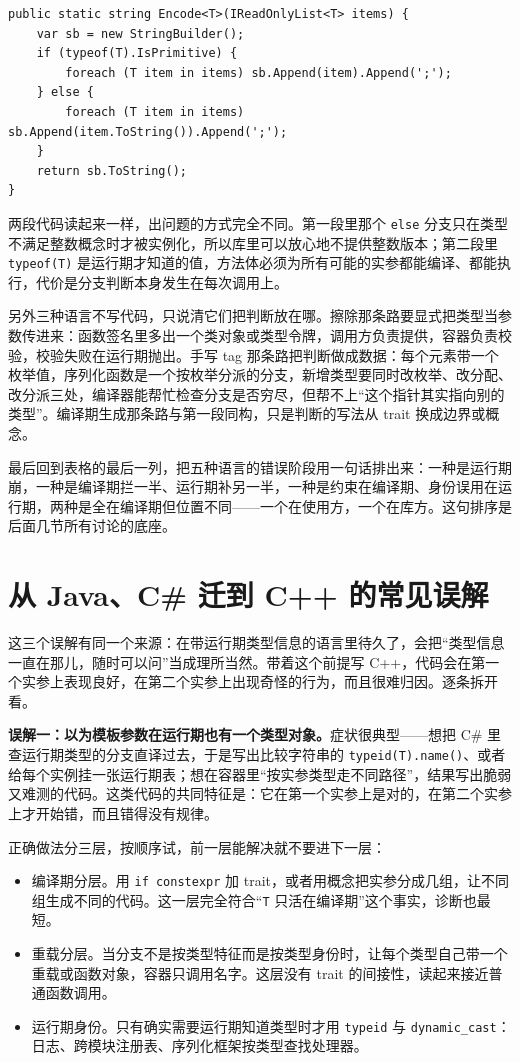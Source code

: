 \documentclass[12pt,a4paper,fontset=fandol]{ctexbook}
\newcommand{\kw}[1]{\texttt{#1}}
\begin{document}
\begin{lstlisting}[style=csharpstyle,caption={C\#：查的是运行期类型对象，同一个方法体对所有实参共享}]
public static string Encode<T>(IReadOnlyList<T> items) {
    var sb = new StringBuilder();
    if (typeof(T).IsPrimitive) {
        foreach (T item in items) sb.Append(item).Append(';');
    } else {
        foreach (T item in items) sb.Append(item.ToString()).Append(';');
    }
    return sb.ToString();
}
\end{lstlisting}

两段代码读起来一样，出问题的方式完全不同。第一段里那个 \kw{else} 分支只在类型不满足整数概念时才被实例化，所以库里可以放心地不提供整数版本；第二段里 \kw{typeof(T)} 是运行期才知道的值，方法体必须为所有可能的实参都能编译、都能执行，代价是分支判断本身发生在每次调用上。

另外三种语言不写代码，只说清它们把判断放在哪。擦除那条路要显式把类型当参数传进来：函数签名里多出一个类对象或类型令牌，调用方负责提供，容器负责校验，校验失败在运行期抛出。手写 tag 那条路把判断做成数据：每个元素带一个枚举值，序列化函数是一个按枚举分派的分支，新增类型要同时改枚举、改分配、改分派三处，编译器能帮忙检查分支是否穷尽，但帮不上“这个指针其实指向别的类型”。编译期生成那条路与第一段同构，只是判断的写法从 trait 换成边界或概念。

最后回到表格的最后一列，把五种语言的错误阶段用一句话排出来：一种是运行期崩，一种是编译期拦一半、运行期补另一半，一种是约束在编译期、身份误用在运行期，两种是全在编译期但位置不同——一个在使用方，一个在库方。这句排序是后面几节所有讨论的底座。

\section{从 Java、C\# 迁到 C++ 的常见误解}

这三个误解有同一个来源：在带运行期类型信息的语言里待久了，会把“类型信息一直在那儿，随时可以问”当成理所当然。带着这个前提写 C++，代码会在第一个实参上表现良好，在第二个实参上出现奇怪的行为，而且很难归因。逐条拆开看。

\textbf{误解一：以为模板参数在运行期也有一个类型对象。}症状很典型——想把 C\# 里查运行期类型的分支直译过去，于是写出比较字符串的 \kw{typeid(T).name()}、或者给每个实例挂一张运行期表；想在容器里“按实参类型走不同路径”，结果写出脆弱又难测的代码。这类代码的共同特征是：它在第一个实参上是对的，在第二个实参上才开始错，而且错得没有规律。

正确做法分三层，按顺序试，前一层能解决就不要进下一层：
\begin{itemize}
\item 编译期分层。用 \kw{if constexpr} 加 trait，或者用概念把实参分成几组，让不同组生成不同的代码。这一层完全符合“\kw{T} 只活在编译期”这个事实，诊断也最短。
\item 重载分层。当分支不是按类型特征而是按类型身份时，让每个类型自己带一个重载或函数对象，容器只调用名字。这层没有 trait 的间接性，读起来接近普通函数调用。
\item 运行期身份。只有确实需要运行期知道类型时才用 \kw{typeid} 与 \kw{dynamic\_cast}：日志、跨模块注册表、序列化框架按类型查找处理器。
\end{itemize}
\end{document}
